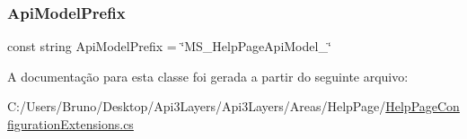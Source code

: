 \subsubsection{\texorpdfstring{Api\+Model\+Prefix}{ApiModelPrefix}}
{\footnotesize\ttfamily const string Api\+Model\+Prefix = \char`\"{}M\+S\+\_\+\+Help\+Page\+Api\+Model\+\_\+\char`\"{}\hspace{0.3cm}{\ttfamily [private]}}



A documentação para esta classe foi gerada a partir do seguinte arquivo\+:\begin{DoxyCompactItemize}
\item 
C\+:/\+Users/\+Bruno/\+Desktop/\+Api3\+Layers/\+Api3\+Layers/\+Areas/\+Help\+Page/\hyperlink{HelpPageConfigurationExtensions_8cs}{Help\+Page\+Configuration\+Extensions.\+cs}\end{DoxyCompactItemize}
